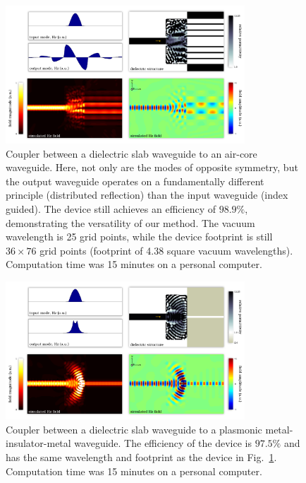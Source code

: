 \begin{figure}[htb]
    \centering
    \includegraphics[width=0.8\textwidth]{p3/3}
    \caption{Coupler between a dielectric slab waveguide to 
            an air-core waveguide.
        Here, not only are the modes of opposite symmetry,
            but the output waveguide operates on a fundamentally different
            principle (distributed reflection) than the input waveguide 
            (index guided).
        The device still achieves an efficiency of $98.9\%$, demonstrating the
            versatility of our method.
        The vacuum wavelength is 25 grid points, 
            while the device footprint is still $36 \times 76$ grid points
            (footprint of 4.38 square vacuum wavelengths).
        Computation time was 15 minutes on a personal computer.
        }
        \label{fig:aircore}
\end{figure}
\begin{figure}[htb]
    \centering
    \includegraphics[width=0.8\textwidth]{p3/4}
    \caption{Coupler between a dielectric slab waveguide to 
            a plasmonic metal-insulator-metal waveguide.
        The efficiency of the device is $97.5\%$ and 
            has the same wavelength and footprint as the device in
            Fig.~\ref{fig:aircore}.
        Computation time was 15 minutes on a personal computer.
        }
        \label{fig:mim}
\end{figure}
